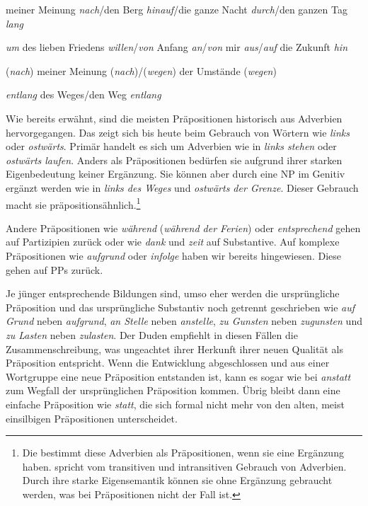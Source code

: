 \ea \label{ea:Stellung_Prä_Post_Zirkum_Position}

\ea \label{ea:Postposition} meiner Meinung \textit{nach}/den Berg \textit{hinauf}/die ganze Nacht \textit{durch}/den ganzen Tag \textit{lang}

\ex \label{ex:Zirkumposition} \textit{um} des lieben Friedens \textit{willen}/\textit{von} Anfang \textit{an}/\textit{von} mir \textit{aus}/\textit{auf} die Zukunft \textit{hin}

\ex \label{ex:Post_Prä_Position} (\textit{nach}) meiner Meinung (\textit{nach})/(\textit{wegen}) der Umstände (\textit{wegen})

\ex \label{ex:Präp_Gen_Post_Akk} \textit{entlang} des Weges/den Weg \textit{entlang}
\z 
\z 


Wie bereits erwähnt, sind die meisten Präpositionen historisch aus Adverbien hervorgegangen. Das zeigt sich bis heute beim Gebrauch von Wörtern wie \textit{links} oder \textit{ostwärts}. Primär handelt es sich um Adverbien wie in \textit{links stehen} oder \textit{ostwärts laufen}. Anders als Präpositionen bedürfen sie aufgrund ihrer starken Eigenbedeutung keiner Ergänzung. Sie können aber durch eine NP im Genitiv ergänzt werden wie in \textit{links des Weges} und \textit{ostwärts der Grenze}. Dieser Gebrauch macht sie präpositionsähnlich.\footnote{Die \citet[817, §1447]{Duden2022} bestimmt diese Adverbien als Präpositionen, wenn sie eine Ergänzung haben. \citet[235--236]{Geuder2019} spricht vom transitiven und intransitiven Gebrauch von Adverbien. Durch ihre starke Eigensemantik können sie ohne Ergänzung gebraucht werden, was bei Präpositionen nicht der Fall ist.}

Andere Präpositionen wie \textit{während} (\textit{während der Ferien}) oder \textit{entsprechend} gehen auf Partizipien zurück oder wie \textit{dank} und \textit{zeit} auf Substantive. Auf komplexe Präpositionen wie \textit{aufgrund} oder \textit{infolge} haben wir bereits hingewiesen. Diese gehen auf PPs zurück.

Je jünger entsprechende Bildungen sind, umso eher werden die ursprüngliche Präposition und das ursprüngliche Substantiv noch getrennt geschrieben wie \zB \textit{auf Grund} neben \textit{aufgrund}, \textit{an Stelle} neben \textit{anstelle}, \textit{zu Gunsten} neben \textit{zugunsten} und \textit{zu Lasten} neben \textit{zulasten}. Der Duden empfiehlt in diesen Fällen die Zusammenschreibung, was ungeachtet ihrer Herkunft ihrer neuen Qualität als Präposition entspricht.  
Wenn die Entwicklung abgeschlossen und aus einer Wortgruppe eine neue Präposition entstanden ist, kann es sogar wie bei \textit{anstatt} zum Wegfall der ursprünglichen Präposition kommen. Übrig bleibt dann eine einfache Präposition wie \textit{statt}, die sich formal nicht mehr von den alten, meist einsilbigen Präpositionen unterscheidet.

